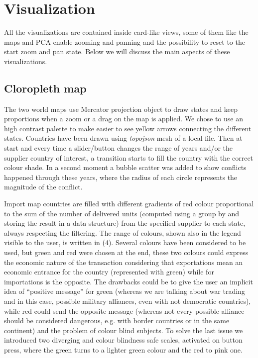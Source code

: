 \documentclass{article}
\begin{document}
\begin{multicols}{2}
\begin{figure}[tb]
\end{figure}

\section{Visualization}
All the visualizations are contained inside card-like views, some of them like the maps and PCA enable zooming and panning and the possibility to reset to the start zoom and pan state.
Below we will discuss the main aspects of these visualizations.  
\subsection{Cloropleth map}
The two world maps use Mercator projection object to draw states and keep proportions when a zoom or a drag on the map is applied. We chose to use an high contrast palette to make easier to see yellow arrows connecting the different states. Countries have been drawn using \textit{topojson} mesh of a local file. Then at start and every time a slider/button changes the range of years and/or the supplier country of interest, a transition starts to fill the country with the correct colour shade. In a second moment a bubble scatter was added to show conflicts happened through these years, where the radius of each circle represents the magnitude of the conflict.  

Import map countries are filled with different gradients of red colour proportional to the sum of the number of delivered units (computed using a group by and storing the result in a data structure) from the specified supplier to each state, always respecting the filtering. The range of colours, shown also in the legend visible to the user, is written in (4). Several colours have been considered to be used, but green and red were chosen at the end, these two colours could express the economic nature of the transaction considering that exportations mean an economic entrance for the country (represented with green) while for importations is the opposite.
The drawbacks could be to give the user an implicit idea of “positive message” for green (whereas we are talking about war trading and in this case, possible military alliances, even with not democratic countries), while red could send the opposite message (whereas not every possible alliance should be considered dangerous, e.g. with border countries or in the same continent) and the problem of colour blind subjects. To solve the last issue we introduced two diverging and colour blindness safe scales, activated on button press, where the green turns to a lighter green colour and the red to pink one.


\end{multicols}
\end{document}
